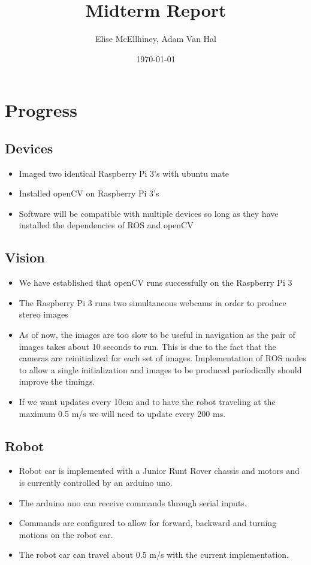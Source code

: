 \documentclass[11pt]{amsart}
\title{Midterm Report}
\author{Elise McEllhiney, Adam Van Hal}
\date{\today}                                           %
\begin{document}
\maketitle

\section{Progress}
\subsection{Devices}
\begin{itemize}
\item Imaged two identical Raspberry Pi 3's with ubuntu mate
\item Installed openCV on Raspberry Pi 3's
\item Software will be compatible with multiple devices so long as they have installed the dependencies of ROS and openCV
\end{itemize}

\subsection{Vision}
\begin{itemize}
\item We have established that openCV runs successfully on the Raspberry Pi 3
\item The Raspberry Pi 3 runs two simultaneous webcams in order to produce stereo images
\item As of now, the images are too slow to be useful in navigation as the pair of images takes about 10 seconds to run.  This is due to the fact that the cameras are reinitialized for each set of images.  Implementation of ROS nodes to allow a single initialization and images to be produced periodically should improve the timings.
\item If we want updates every 10cm and to have the robot traveling at the maximum 0.5 m/s we will need to update every 200 ms.
\end{itemize}

\subsection{Robot}
\begin{itemize}
\item Robot car is implemented with a Junior Runt Rover chassis and motors and is currently controlled by an arduino uno.
\item The arduino uno can receive commands through serial inputs.
\item Commands are configured to allow for forward, backward and turning motions on the robot car.
\item The robot car can travel about 0.5 m/s with the current implementation.
\end{itemize}
\end{document}
